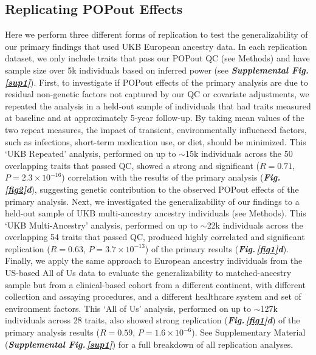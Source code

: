 \documentclass[12pt]{zHenriquesLab-StyleBioRxiv}
\newcommand\dref[2]{\normalsize{\textbf{\textit{Fig.\,\ref{#1}#2}}}\normalsize{}}
\newcommand\sref[1]{\normalsize{\textbf{\textit{Supplemental Fig.\,\ref{#1}}}}\normalsize{}}
\begin{document}
\subsection*{Replicating POPout Effects} \label{sec:res1}
Here we perform three different forms of replication to test the generalizability of our primary 
findings that used UKB European ancestry data. In each replication dataset, 
we only include traits that pass our POPout QC (see Methods) and have sample size 
over 5k individuals based on inferred power (see \sref{sup1}). First, 
to investigate if POPout effects of the primary analysis are due to residual 
non-genetic factors not captured by our QC or covariate adjustments, we repeated 
the analysis in a held-out sample of individuals that had traits measured at 
baseline and at approximately 5-year follow-up. By taking mean values of the 
two repeat measures, the impact of transient, environmentally influenced factors, 
such as infections, short-term medication use, or diet, should be minimized. 
This ‘UKB Repeated’ analysis, performed on up to $\sim$15k individuals across the 
50 overlapping traits that passed QC, showed a strong and 
significant ($R=0.71$, $P=2.3 \times 10^{-16}$) correlation with the results 
of the primary analysis (\dref{fig2}{d}), suggesting genetic contribution to the 
observed POPout effects of the primary analysis. Next, we investigated the generalizability 
of our findings to a held-out sample of UKB multi-ancestry ancestry individuals (see Methods). 
This ‘UKB Multi-Ancestry’ analysis, performed on up to $\sim$22k individuals across the 
overlapping 54 traits that passed QC, produced highly correlated and significant 
replication ($R=0.63$, $P=3.7 \times 10^{-13}$) of the primary results (\dref{fig1}{d}). 
Finally, we apply the same approach to European ancestry individuals from the 
US-based All of Us data \cite{Bick2024} to evaluate the generalizability to matched-ancestry 
sample but from a clinical-based cohort from a different continent, with different 
collection and assaying procedures, and a different healthcare system and set of 
environment factors. This ‘All of Us’ analysis, performed on up to $\sim$127k individuals 
across 28 traits, also showed strong replication (\dref{fig1}{d}) of the primary 
analysis results ($R=0.59$, $P=1.6 \times 10^{-6}$). 
See Supplementary Material (\sref{sup1}) for a full breakdown of all replication analyses. 
%
%
\end{document}
